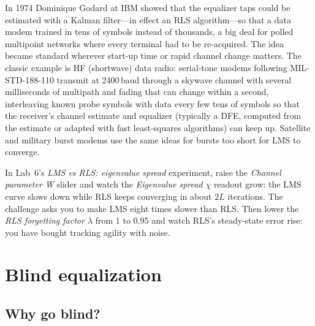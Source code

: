 
\begin{inpractice}
In 1974 Dominique Godard at IBM showed that the equalizer taps could be estimated with a Kalman
filter---in effect an RLS algorithm---so that a data modem trained in tens of symbols instead of
thousands, a big deal for polled multipoint networks where every terminal had to be re-acquired.
The idea became standard wherever start-up time or rapid channel change matters. The classic
example is HF (shortwave) data radio: serial-tone modems following MIL-STD-188-110 transmit at
2400\,baud through a skywave channel with several milliseconds of multipath and fading that can
change within a second, interleaving known probe symbols with data every few tens of symbols so
that the receiver's channel estimate and equalizer (typically a DFE, computed from the estimate or
adapted with fast least-squares algorithms) can keep up. Satellite and military burst modems use the
same ideas for bursts too short for LMS to converge.
\end{inpractice}

\begin{tryit}
In Lab~6's \emph{LMS vs RLS: eigenvalue spread} experiment, raise the \emph{Channel parameter W}
slider and watch the \emph{Eigenvalue spread $\chi$} readout grow: the LMS curve slows down while
RLS keeps converging in about $2L$ iterations. The challenge asks you to make LMS eight times slower
than RLS. Then lower the \emph{RLS forgetting factor $\lambda$} from 1 to 0.95 and watch RLS's
steady-state error rise: you have bought tracking agility with noise.
\end{tryit}

\section{Blind equalization}
\label{sec:ch12:blind}

\subsection{Why go blind?}

